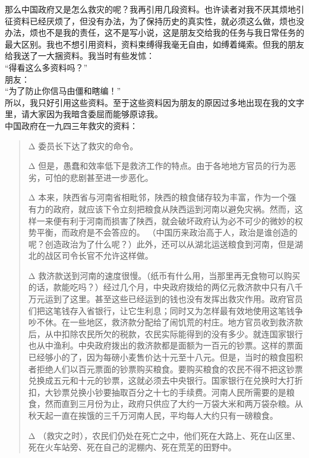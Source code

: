 那么中国政府又是怎么救灾的呢？我再引用几段资料。也许读者对我不厌其烦地引征资料已经厌烦了，但没有办法，为了保持历史的真实性，就必须这么做，烦也没办法，烦也不是我的责任，这不是写小说，这是朋友交给我的任务与我日常任务的最大区别。我也不想引用资料，资料束缚得我毫无自由，如缚着绳索。但我的朋友给我送了一大捆资料。我当时有些发怵：\\

“得看这么多资料吗？”\\

朋友：\\

“为了防止你信马由僵和瞎编！”\\

所以，我只好引用这些资料。至于这些资料因为朋友的原因过多地出现在我的文字里，请大家因为我暗含委屈而能够原谅我。\\

中国政府在一九四三年救灾的资料：\\

\begin{quote}
	\begin{description}
		\item {\Add Δ} 委员长下达了救灾的命令。\\
		
		\item {\Add Δ} 但是，愚蠢和效率低下是救济工作的特点。由于各地地方官员的行为恶劣，可怕的悲剧甚至进一步恶化。\\
		
		\item {\Add Δ} 本来，陕西省与河南省相毗邻，陕西的粮食储存较为丰富，作为一个强有力的政府，就应该下令立刻把粮食从陕西运到河南以避免灾祸。然而，这样一来便有利于河南而损害了陕西，就会破坏政府认为必不可少的微妙的权势平衡，而政府是不会答应的。 （中国历来政治高于人，政治是谁创造的呢？创造政治为了什么呢？）此外，还可以从湖北运送粮食到河南，但是湖北的战区司令长官不允许这样做。\\
		
		\item {\Add Δ} 救济款送到河南的速度很慢。（纸币有什么用，当那里再无食物可以购买的话，款能吃吗？）经过几个月，中央政府拨给的两亿元救济款中只有八千万元运到了这里。甚至这些已经运到的钱也没有发挥出救灾作用。政府官员们把这笔钱存入省银行，让它生利息；同时又为怎样最有效地使用这笔钱争吵不休。在一些地区，救济款分配给了闹饥荒的村庄。地方官员收到救济款后，从中扣除农民所欠的税款，农民实际能得到的没有多少。就连国家银行也从中渔利。中央政府拨出的救济款都是面额为一百元的钞票。这样的票面已经够小的了，因为每磅小麦售价达十元至十八元。但是，当时的粮食囤积者拒绝人们以百元票面的钞票购买粮食。要购买粮食的农民不得不把这钞票兑换成五元和十元的钞票，这就必须去中央银行。国家银行在兑换时大打折扣，大钞票兑换小钞要抽取百分之十七的手续费。河南人民所需要的是粮食，然而直到三月份为止，政府只供应了大约一万袋大米和两万袋杂粮。从秋天起一直在挨饿的三千万河南人民，平均每人大约只有一磅粮食。\\
		
		\item {\Add Δ} （救灾之时），农民们仍处在死亡之中，他们死在大路上、死在山区里、死在火车站旁、死在自己的泥棚内、死在荒芜的田野中。\\
	\end{description}
\end{quote}

